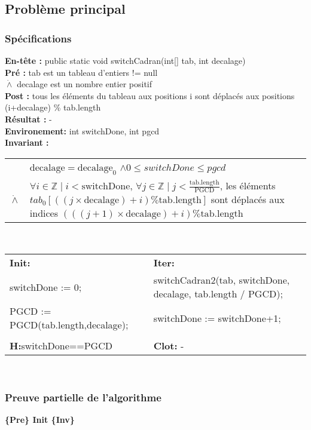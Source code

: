 \subsection{Problème principal}
\subsubsection*{Spécifications}
\noindent \textbf{En-tête :} public static void switchCadran(int[] tab, int decalage)\\
\noindent \textbf{Pré :} tab est un tableau d'entiers != null\\
\indent $\dot{\wedge}$ decalage est un nombre entier positif\\
\textbf{Post :} tous les éléments du tableau aux positions i sont déplacés aux positions (i+decalage) \% tab.length\\
\textbf{Résultat :} - \\

\noindent \textbf{Environement: } int switchDone, int pgcd\\

\noindent \textbf{Invariant :}

\begin{tabular}{lp{14cm}}

& $\mathrm{decalage}=\mathrm{decalage}_{0}$ $\wedge 0 \leq switchDone \leq pgcd$\\
$\dot{\wedge}$ & $\forall i \in \mathbb{Z} \mid i < \mathrm{switchDone} $, $\forall j \in \mathbb{Z} \mid j < \frac{\mathrm{tab.length}}{\mathrm{PGCD}}$, les éléments $tab_{0}[((j \times \mathrm{decalage}) + i) \% \mathrm{tab.length}]$ sont déplacés aux indices $(((j+1)\times \mathrm{decalage})+i) \% \mathrm{tab.length}$ \\
\end{tabular}\\

\noindent \begin{tabular}{ll}
\textbf{Init: } & \textbf{Iter: }\\
switchDone := 0; & switchCadran2(tab, switchDone, decalage, tab.length / PGCD); \\
PGCD := PGCD(tab.length,decalage); & switchDone := switchDone+1;\\
 & \\
\textbf{H:}switchDone==PGCD & \textbf{Clot: } -\\
\end{tabular}\\

\subsubsection*{Preuve partielle de l'algorithme}
\textbf{\{Pre\} Init \{Inv\}}

